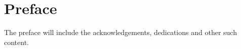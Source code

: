 \section*{Preface} \label{sec:preface}
The preface will include the acknowledgements, dedications and other such content.
